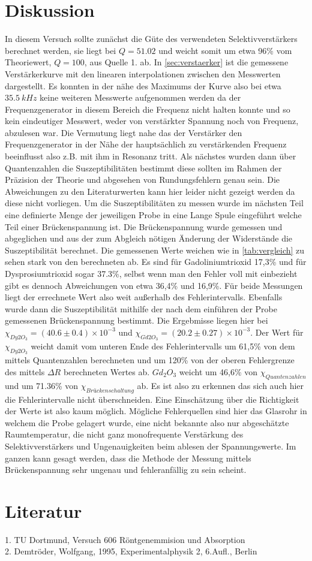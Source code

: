 \section{Diskussion} %
\label{sec:Diskussion}
In diesem Versuch sollte zunächst die Güte des verwendeten Selektivverstärkers berechnet werden,
sie liegt bei $Q=51.02$ und weicht somit um etwa 96\% vom Theoriewert, $Q=100$, aus Quelle 1. ab. In
\autoref{sec:verstaerker} ist die gemessene Verstärkerkurve mit den linearen interpolationen 
zwischen den Messwerten dargestellt. Es konnten
in der nähe des Maximums der Kurve also bei etwa $\SI[]{35.5}[]{kHz}$ keine weiteren Messwerte aufgenommen werden
da der Frequenzgenerator in diesem Bereich die Frequenz nicht halten konnte und so kein eindeutiger 
Messwert, weder von verstärkter Spannung noch von Frequenz, abzulesen war. Die Vermutung liegt nahe das
der Verstärker den Frequenzgenerator in der Nähe der hauptsächlich zu verstärkenden Frequenz beeinflusst
also z.B. mit ihm in Resonanz tritt. Als nächstes wurden dann über Quantenzahlen die Suszeptibilitäten 
bestimmt diese sollten im Rahmen der Präzision der Theorie und abgesehen von Rundungsfehlern genau sein. Die
Abweichungen zu den Literaturwerten kann hier leider nicht gezeigt werden da diese nicht vorliegen.
Um die Suszeptibilitäten zu messen wurde im nächsten Teil eine definierte Menge 
der jeweiligen Probe in eine Lange Spule eingeführt welche Teil einer Brückenspannung
ist. Die Brückenspannung wurde gemessen und abgeglichen und aus der zum Abgleich nötigen Änderung der Widerstände
die Suszeptibilität berechnet. Die gemessenen Werte weichen wie in \autoref{tab:vergleich} zu sehen stark von den berechneten ab.
Es sind für  Gadoliniumtrioxid 17,3\% und für Dysprosiumtrioxid sogar 37.3\%, selbst wenn man den Fehler voll mit einbezieht
gibt es dennoch Abweichungen von etwa 36,4\% und 16,9\%. Für beide Messungen liegt der errechnete Wert also weit außerhalb des Fehlerintervalls.
Ebenfalls wurde dann die  Suszeptibilität mithilfe der nach dem einführen der Probe gemessenen Brückenspannung bestimmt.
Die Ergebmisse liegen hier bei $\chi_{Dy2 O_3}=(40.6\pm 0.4) \times 10^{-3}$ und 
$\chi_{Gd2 O_3}=(20.2\pm 0.27) \times 10^{-3}$. Der Wert für $\chi_{Dy2 O_3}$ weicht damit vom unteren Ende des Fehlerintervalls um 61,5\% von dem mittels Quantenzahlen
berechneten und um 120\% von der oberen Fehlergrenze des mittels $\Delta R$ berechneten Wertes ab. $Gd_2 O_3$ weicht um 46,6\% von $\chi_{Quantenzahlen}$
und um 71.36\% von $\chi_{Brückenschaltung}$ ab. Es ist also zu erkennen das sich auch hier die Fehlerintervalle nicht überschneiden. Eine Einschätzung über die Richtigkeit
der Werte ist also kaum möglich.
Mögliche Fehlerquellen sind hier das Glasrohr in welchem die Probe gelagert wurde,
eine nicht bekannte also nur abgeschätzte Raumtemperatur, die nicht ganz monofrequente Verstärkung des Selektivverstärkers
und Ungenauigkeiten beim ablesen der Spannungswerte.
Im ganzen kann gesagt werden, dass die Methode der Messung mittels Brückenspannung sehr ungenau und fehleranfällig zu sein scheint.
\section{Literatur}
\label{Literatur}
1. TU Dortmund, Versuch 606 Röntgenemmision und Absorption\\
2. Demtröder, Wolfgang, 1995, Experimentalphysik 2, 6.Aufl., Berlin\\
